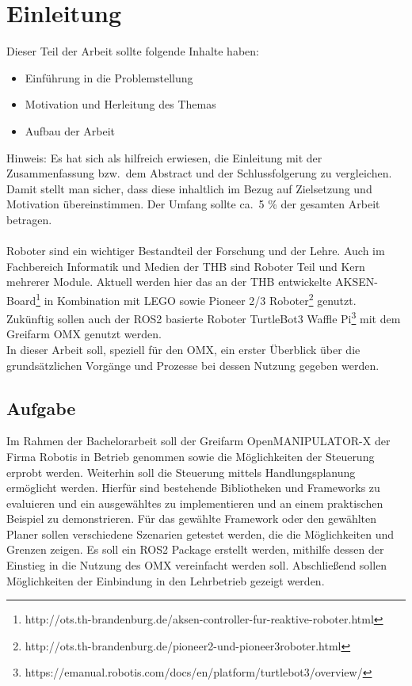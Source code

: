 \section{Einleitung} \label{einleitung}
Dieser Teil der Arbeit sollte folgende Inhalte haben:

\begin{itemize}
\item Einführung in die Problemstellung
\item Motivation und Herleitung des Themas
\item Aufbau der Arbeit
\end{itemize}

Hinweis:
Es hat sich als hilfreich erwiesen, die Einleitung mit der Zusammenfassung bzw.\ dem Abstract und der Schlussfolgerung zu vergleichen.
Damit stellt man sicher, dass diese inhaltlich im Bezug auf Zielsetzung und Motivation übereinstimmen.
Der Umfang sollte ca.\ 5 \% der gesamten Arbeit betragen.
\\
\\
Roboter sind ein wichtiger Bestandteil der Forschung und der Lehre.
Auch im Fachbereich Informatik und Medien der \ac{THB} sind Roboter Teil und Kern mehrerer Module.
Aktuell werden hier das an der \ac{THB} entwickelte AKSEN-Board\footnote{http://ots.th-brandenburg.de/aksen-controller-fur-reaktive-roboter.html} in Kombination mit LEGO sowie Pioneer 2/3 Roboter\footnote{http://ots.th-brandenburg.de/pioneer2-und-pioneer3roboter.html} genutzt.
Zukünftig sollen auch der \ac{ROS2} basierte Roboter TurtleBot3 Waffle Pi\footnote{https://emanual.robotis.com/docs/en/platform/turtlebot3/overview/} mit dem Greifarm OMX genutzt werden.\\
In dieser Arbeit soll, speziell für den OMX, ein erster Überblick über die grundsätzlichen Vorgänge und Prozesse bei dessen Nutzung gegeben werden.

\subsection{Aufgabe}
Im Rahmen der Bachelorarbeit soll der Greifarm OpenMANIPULATOR-X der Firma Robotis in Betrieb genommen sowie die Möglichkeiten der Steuerung erprobt werden.
Weiterhin soll die Steuerung mittels Handlungsplanung ermöglicht werden.
Hierfür sind bestehende Bibliotheken und Frameworks zu evaluieren und ein ausgewähltes zu implementieren und an einem praktischen Beispiel zu demonstrieren.
Für das gewählte Framework oder den gewählten Planer sollen verschiedene Szenarien getestet werden, die die Möglichkeiten und Grenzen zeigen.
Es soll ein ROS2 Package erstellt werden, mithilfe dessen der Einstieg in die Nutzung des OMX vereinfacht werden soll.
Abschließend sollen Möglichkeiten der Einbindung in den Lehrbetrieb gezeigt werden.

